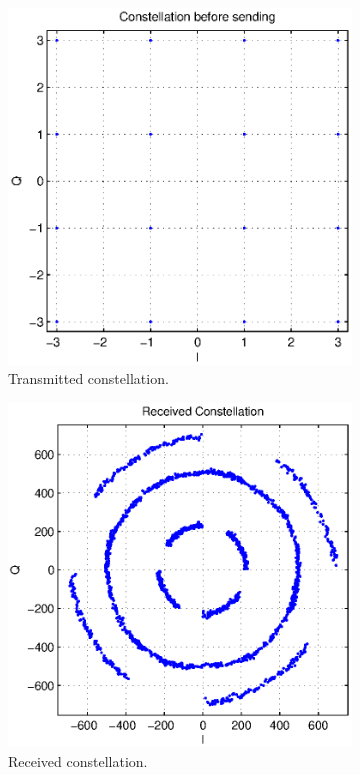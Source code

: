 \documentclass[12pt,a4paper,openright]{article}
\begin{document}
 \begin{figure}[h]
 \centering
\begin{subfigure}{0.32\textwidth}
 \centering
    \includegraphics[width=0.8\linewidth]{tx_const.eps}
    \caption{Transmitted constellation.}
    \label{DPLL}
\end{subfigure}%
\begin{subfigure}{0.32\textwidth}
 \centering
    \includegraphics[width=0.8\linewidth]{rx_const.eps}
    \caption{Received constellation.}
    \label{PD}
    \end{subfigure}
    \begin{subfigure}{0.32\textwidth}

\end{subfigure}
\end{figure}
\end{document}
